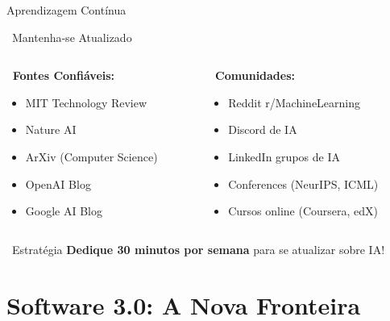 \documentclass[aspectratio=169,12pt]{beamer}
\begin{document}
\begin{frame}{Aprendizagem Contínua}
    \begin{block}{\faGraduationCap\, Mantenha-se Atualizado}
        \begin{columns}
            \begin{column}{0.5\textwidth}
                \textbf{\faNewspaper\, Fontes Confiáveis:}
                \begin{itemize}
                    \item MIT Technology Review
                    \item Nature AI
                    \item ArXiv (Computer Science)
                    \item OpenAI Blog
                    \item Google AI Blog
                \end{itemize}
            \end{column}
            \begin{column}{0.5\textwidth}
                \textbf{\faUsers\, Comunidades:}
                \begin{itemize}
                    \item Reddit r/MachineLearning
                    \item Discord de IA
                    \item LinkedIn grupos de IA
                    \item Conferences (NeurIPS, ICML)
                    \item Cursos online (Coursera, edX)
                \end{itemize}
            \end{column}
        \end{columns}
    \end{block}
    
    \begin{exampleblock}{\faCalendar\, Estratégia}
        \textbf{Dedique 30 minutos por semana} para se atualizar sobre IA!
    \end{exampleblock}
\end{frame}


\section{Software 3.0: A Nova Fronteira}
\end{document}
